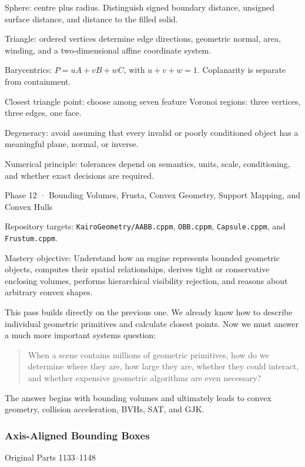 Sphere: centre plus radius. Distinguish signed boundary distance, unsigned surface distance, and distance to the filled solid.

Triangle: ordered vertices determine edge directions, geometric normal, area, winding, and a two-dimensional affine coordinate system.

Barycentrics: \(P=uA+vB+wC\), with \(u+v+w=1\). Coplanarity is separate from containment.

Closest triangle point: choose among seven feature Voronoi regions: three vertices, three edges, one face.

Degeneracy: avoid assuming that every invalid or poorly conditioned object has a meaningful plane, normal, or inverse.

Numerical principle: tolerances depend on semantics, units, scale, conditioning, and whether exact decisions are required.

Phase 12 · Bounding Volumes, Frusta, Convex Geometry, Support Mapping, and Convex Hulls

Repository targets: \texttt{KairoGeometry/AABB.cppm}, \texttt{OBB.cppm}, \texttt{Capsule.cppm}, and \texttt{Frustum.cppm}.

Mastery objective: Understand how an engine represents bounded geometric objects, computes their spatial relationships, derives tight or conservative enclosing volumes, performs hierarchical visibility rejection, and reasons about arbitrary convex shapes.

This pass builds directly on the previous one. We already know how to describe individual geometric primitives and calculate closest points. Now we must answer a much more important systems question:

\begin{quote}
When a scene contains millions of geometric primitives, how do we determine where they are, how large they are, whether they could interact, and whether expensive geometric algorithms are even necessary?
\end{quote}

The answer begins with bounding volumes and ultimately leads to convex geometry, collision acceleration, BVHs, SAT, and GJK.

\subsubsection{Axis-Aligned Bounding Boxes}\label{axis-aligned-bounding-boxes}

Original Parts 1133--1148

